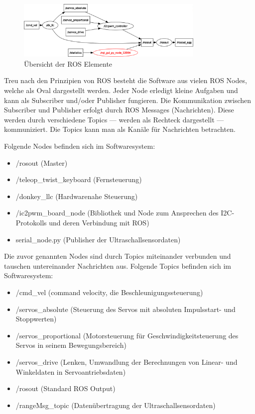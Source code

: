 \documentclass[conference]{IEEEtran}
\begin{document}
\begin{figure}[!ht] 
	\centering
	\includegraphics[width=9cm]{img/rosgraph.png}
	\caption{Übersicht der ROS Elemente}
	\label{rosgraph}
\end{figure}

Treu nach den Prinzipien von ROS besteht die Software aus vielen ROS Nodes, welche als Oval dargestellt werden. 
Jeder Node erledigt kleine Aufgaben und kann als Subscriber und/oder Publisher fungieren.
Die Kommunikation zwischen Subscriber und Publisher erfolgt durch ROS Messages (Nachrichten).
Diese werden durch verschiedene Topics — werden als Rechteck dargestellt — kommuniziert.
Die Topics kann man als Kanäle für Nachrichten betrachten.

Folgende Nodes befinden sich im Softwaresystem:
\begin{itemize}
	\item /rosout (Master)
	\item /teleop\_twist\_keyboard (Fernsteuerung)
	\item /donkey\_llc (Hardwarenahe Steuerung)
	\item /ic2pwm\_board\_node (Bibliothek und Node zum Ansprechen des I2C-Protokolls und deren Verbindung mit ROS)
	\item serial\_node.py (Publisher der Ultraschallsensordaten)
\end{itemize}

Die zuvor genannten Nodes sind durch Topics miteinander verbunden und tauschen untereinander Nachrichten aus.
Folgende Topics befinden sich im Softwaresystem:
\begin{itemize}
	\item /cmd\_vel (command velocity, die Beschleunigungssteuerung)
	\item /servos\_absolute (Steuerung des Servos mit absoluten Impulsstart- und Stoppwerten)
	\item /servos\_proportional (Motorsteuerung für Geschwindigkeitsteuerung des Servos in seinem Bewegungsbereich)
	\item /servos\_drive (Lenken, Umwandlung der Berechnungen von Linear- und Winkeldaten in Servoantriebsdaten)
	\item /rosout (Standard ROS Output)
	\item /rangeMsg\_topic (Datenübertragung der Ultraschallsensordaten)
\end{itemize}
\end{document}
